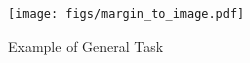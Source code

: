 \begin{figure}[h!]
    \centering
    \texttt{[image: figs/margin\_to\_image.pdf]}
    \vspace{-7pt}
    \caption{Example of General Task}
    \label{fig:example_general}
    \vspace{-10pt}
\end{figure}